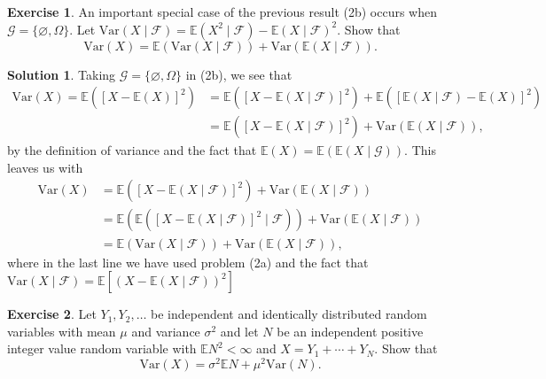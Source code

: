 \documentclass[12pt]{article}
\newcommand{\calF}{\mathcal{F}}
\newcommand{\Expect}{\mathbb{E}}
\newcommand{\Var}{\text{Var}}
\theoremstyle{definition}
\newtheorem{exer}{Exercise}
\newtheorem{sol}{Solution}
\theoremstyle{remark}
\begin{document}
\begin{exer}
    An important special case of the previous result (2b) occurs when $\mathcal{G} = \{\varnothing, \Omega \}$. Let $\Var(X\mid\calF) = \Expect(X^2\mid\calF) - \Expect(X\mid\calF)^2$. Show that
    \begin{equation}
        \Var(X) = \Expect(\Var(X\mid\calF)) + \Var(\Expect(X\mid \calF)).
    \end{equation}
\end{exer}

\begin{sol}\leavevmode

    Taking $\mathcal{G} = \{\varnothing, \Omega \}$ in (2b), we see that 
    \begin{align}
        \Var(X) = \Expect( [X - \Expect(X)]^2) &= \Expect( [X - \Expect(X\mid \calF)]^2 ) + \Expect([\Expect(X\mid\calF) - \Expect(X)]^2)\\
            &=  \Expect( [X - \Expect(X\mid \calF)]^2 ) + \Var(\Expect(X\mid\calF)  ), 
    \end{align}
    by the definition of variance and the fact that $\Expect(X) = \Expect(\Expect(X\mid\mathcal{G}))$. This leaves us with
    \begin{align}
        \Var(X) &=    \Expect( [X - \Expect(X\mid \calF)]^2 ) + \Var(\Expect(X\mid\calF)  ) \\
                &=    \Expect( \Expect([X - \Expect(X\mid\calF)]^2 \mid \calF )) + \Var(\Expect(X\mid\calF))\\
                &= \Expect(\Var(X\mid \calF)) + \Var(\Expect(X\mid\calF)),
    \end{align}
    where in the last line we have used problem (2a) and the fact that $\Var(X\mid \calF) = \Expect[(X - \Expect(X\mid \calF))^2]$

\end{sol}

\newpage
 
\begin{exer}
    Let $Y_1, Y_2, \ldots$ be independent and identically distributed random variables with mean $\mu$ and variance $\sigma^2$ and let $N$ be an independent positive integer value random variable with $\Expect N^2 < \infty$ and $X = Y_1 + \cdots + Y_N$. Show that
    \begin{equation}
        \Var(X) = \sigma^2 \Expect N + \mu^2 \Var(N).
    \end{equation}
\end{exer}
\end{document}
